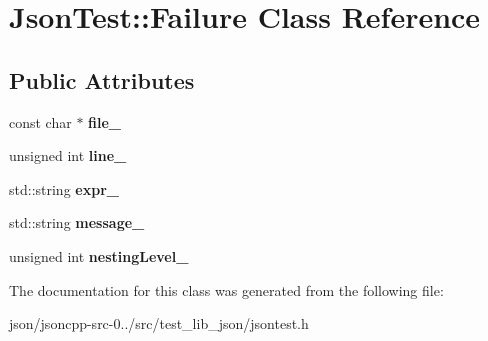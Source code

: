 \hypertarget{class_json_test_1_1_failure}{\section{Json\+Test\+:\+:Failure Class Reference}
\label{class_json_test_1_1_failure}
}
\subsection*{Public Attributes}
\begin{DoxyCompactItemize}
\item 
\hypertarget{class_json_test_1_1_failure_ab1dcb6c5b1a26d18ec63aad0520ecd8b}{const char $\ast$ {\bfseries file\+\_\+}}\label{class_json_test_1_1_failure_ab1dcb6c5b1a26d18ec63aad0520ecd8b}

\item 
\hypertarget{class_json_test_1_1_failure_a5981cfa4cf633915a0d991363cbd7892}{unsigned int {\bfseries line\+\_\+}}\label{class_json_test_1_1_failure_a5981cfa4cf633915a0d991363cbd7892}

\item 
\hypertarget{class_json_test_1_1_failure_a8758f5315f9557e2555cf08c1208a096}{std\+::string {\bfseries expr\+\_\+}}\label{class_json_test_1_1_failure_a8758f5315f9557e2555cf08c1208a096}

\item 
\hypertarget{class_json_test_1_1_failure_a3014957184af11f03ebcea9998e722d2}{std\+::string {\bfseries message\+\_\+}}\label{class_json_test_1_1_failure_a3014957184af11f03ebcea9998e722d2}

\item 
\hypertarget{class_json_test_1_1_failure_ac7b5fe3f58bd761d8a04e356e575a4d7}{unsigned int {\bfseries nesting\+Level\+\_\+}}\label{class_json_test_1_1_failure_ac7b5fe3f58bd761d8a04e356e575a4d7}

\end{DoxyCompactItemize}


The documentation for this class was generated from the following file\+:\begin{DoxyCompactItemize}
\item 
json/jsoncpp-\/src-\/0../src/test\+\_\+lib\+\_\+json/jsontest.\+h\end{DoxyCompactItemize}
